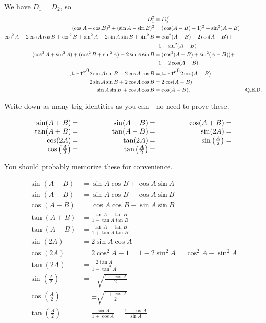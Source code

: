 \documentclass[../gatm_answers.tex]{subfiles}
\begin{document}
We have $D_1=D_2$, so
\begin{align*}
D_1^2&=D_2^2 \\
(\cos A - \cos B)^2 + (\sin A - \sin B)^2 &= (\cos(A-B)-1)^2+\sin^2 (A-B) \\
\cos^2 A - 2\cos A\cos B + \cos^2 B + \sin^2 A - 2\sin A\sin B + \sin^2 B &= \cos^2 (A-B) - 2\cos(A-B) + \\ &\phantom{=} 1+\sin^2(A-B) \\
(\cos^2 A + \sin^2 A) + (\cos^2 B + \sin^2 A) - 2\sin A\sin B &= (\cos^2 (A-B) + \sin^2(A-B)) + \\ &\phantom{=} 1 - 2\cos(A-B) \\
\cancelto{0}{1 + 1} - 2\sin A\sin B - 2\cos A\cos B &= \cancelto{0}{1 + 1} - 2\cos(A-B) \\
2\sin A\sin B + 2\cos A\cos B &= 2\cos(A-B) \\
\sin A\sin B + \cos A\cos B &= \cos(A-B). & \text{Q.E.D.} \\
\end{align*}

\begin{outer_problem}
\item Write down as many trig identities as you can---no need to prove these.

\renewcommand{\arraystretch}{1.1}
$$\arraycolsep=1pt\begin{array}{rlrlrl}
\sin(A+B)&=\qquad\qquad\phantom{.}&\sin(A-B) &=\qquad\qquad\phantom{.}&\cos(A+B) &= \\
\tan(A+B)&= &\tan(A-B) &= &\sin(2A) &= \\
\cos(2A)&= &\tan(2A) &= &\sin\left(\frac{A}{2}\right) &= \\
\cos\left(\frac{A}{2}\right)&= &\tan\left(\frac{A}{2}\right) &= & & \\
\end{array}$$
\end{outer_problem}

You should probably memorize these for convenience.

\renewcommand{\arraystretch}{1.1}
\begin{align*}
\sin(A+B)&= \sin A \cos B + \cos A \sin A \\
\sin(A-B) &= \sin A \cos B - \cos A \sin B \\
\cos(A+B) &= \cos A \cos B - \sin A \sin B \\
\tan(A+B)&= \frac{\tan A + \tan B}{1-\tan A\tan B}\\
\tan(A-B) &= \frac{\tan A - \tan B}{1+\tan A\tan B}\\
\sin(2A) &= 2\sin A\cos A\\
\cos(2A)&= 2\cos^2 A - 1 = 1 - 2\sin^2 A = \cos^2 A - \sin^2 A \\
\tan(2A) &= \frac{2\tan A}{1-\tan^2 A}\\
\sin\left(\frac{A}{2}\right) &= \pm\sqrt{\frac{1-\cos A}{2}}\\
\cos\left(\frac{A}{2}\right)&= \pm\sqrt{\frac{1+\cos A}{2}}\\
\tan\left(\frac{A}{2}\right) &= \frac{\sin A}{1+\cos A} = \frac{1-\cos A}{\sin A}
\end{align*}
\end{document}

